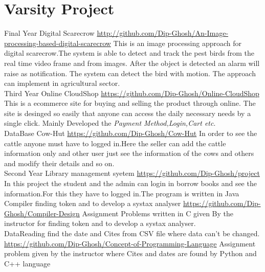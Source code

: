 \documentclass[]{cv-style}
\begin{document}
\section{Varsity Project }
\begin{entrylist}
  \entry
    {Final Year}
    {Digital Scarecrow}
    {\href{https://github.com/Dip-Ghosh/An-Image-processing-based-digital-scarecrow}
    {http://github.com/Dip-Ghosh/An-Image-processing-based-digital-scarecrow}}
    {This is an image processing approach for digital scarecrow.The system is able to detect and track the pest birds from the real time video frame and from images. After the object is detected an alarm will raise as notification. The system can detect the bird with motion. The approach can implement in agricultural sector.}\\
  \entry
    {Third Year}
    {Online CloudShop}
    {\href{https://github.com/Dip-Ghosh/Online-CloudShop}{https://github.com/Dip-Ghosh/Online-CloudShop}}
    {This is a ecommerce site for buying and selling the product through online. The site is desinged so easily that anyone can access the daily necessary needs by a single click. Mainly Developed the \emph{Payment Method,Login,Cart etc}.}
    \\
  \entry
    {DataBase}
    {Cow-Hut}
    {\href{https://github.com/Dip-Ghosh/Cow-Hut}
    {https://github.com/Dip-Ghosh/Cow-Hut}}
    {In order to see the cattle anyone must have to logged in.Here the seller can add the cattle information only and other user just see the information of the cows and others and modify their details and so on.}\\
     \entry
    {Second Year}
    {Library management syetem}
    {\href{https://github.com/Dip-Ghosh/project}
    {https://github.com/Dip-Ghosh/project}}
    {In this project the student and the admin can login in borrow books and see the information.For this they have to logged in.The program is written in Java}
    \\
     \entry
    {Compiler}
    { finding token and to develop a systax analyser }
    {\href{https://github.com/Dip-Ghosh/Compiler-Design}
    {https://github.com/Dip-Ghosh/Compiler-Design}}
    {Assignment Problems written in C given By the instructor for finding token and to develop a systax analyser.}\\
      \entry
    {DataReading}
    {find the date and Cites from CSV file where data can't be changed.}
    {\href{https://github.com/Dip-Ghosh/Concept-of-Programming-Language}{https://github.com/Dip-Ghosh/Concept-of-Programming-Language}}
    { Assignment problem given by the instructor where  Cites and dates are found by Python and C++ language}

\end{entrylist}
\end{document}

